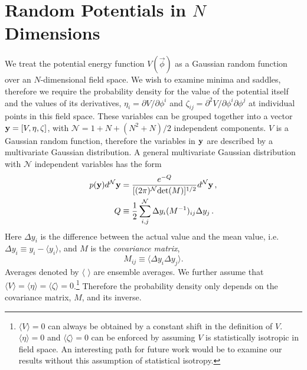\documentclass[12pt]{article}
\begin{document}
\section{Random Potentials in $N$ Dimensions}

We treat the potential energy function $V({\vec{\phi}})$ as a Gaussian random function over an $N$-dimensional field space. We wish to examine minima and saddles, therefore we require the probability density for the value of the potential itself and the values of its derivatives, $\eta_i = \partial V/\partial \phi^i$ and $\zeta_{ij}=\partial^2 V/\partial \phi^i\partial \phi^j$ at individual points in this field space. These variables can be grouped together into a vector ${\bf y} = [V,\eta,\zeta]$, with $\mathcal{N}=1+N+(N^2+N)/2$ independent components. $V$ is a Gaussian random function, therefore the variables in ${\bf y}$ are described by a multivariate Gaussian distribution. A general multivariate Gaussian distribution with $\mathcal{N}$ independent variables has the form
\begin{equation} \label{MultivariateGaussian}
\begin{split}
p({\bf y})d^\mathcal{N}{\bf y} &= \frac{e^{-Q}}{[(2\pi)^\mathcal{N} \mathrm{det}(M)]^{1/2}} d^\mathcal{N}{\bf y} \, ,\\
Q &\equiv \frac{1}{2} \sum_{i,j}^\mathcal{N} \Delta y_i (M^{-1})_{ij} \Delta y_{j} \, .\\
\end{split}
\end{equation}
%
Here $\Delta y_i$ is the difference between the actual value and the mean value, i.e. $\Delta y_i \equiv y_i - \langle y_i \rangle$, and $M$ is the \emph{covariance matrix}, 
%
\begin{equation}
M_{ij} \equiv \langle \Delta y_i \Delta y_j \rangle.
\end{equation}
%
Averages denoted by $\langle \,\,\rangle$ are ensemble averages. We further assume that $\langle V\rangle = \langle \eta\rangle = \langle \zeta\rangle = 0$.\footnote{$\langle V\rangle=0$ can always be obtained by a constant shift in the definition of $V$. $\langle \eta \rangle = 0$ and $\langle \zeta\rangle = 0$ can be enforced by assuming $V$ is statistically isotropic in field space. An interesting path for future work would be to examine our results without this assumption of statistical isotropy.} Therefore the probability density only depends on the covariance matrix, $M$, and its inverse.
\end{document}
